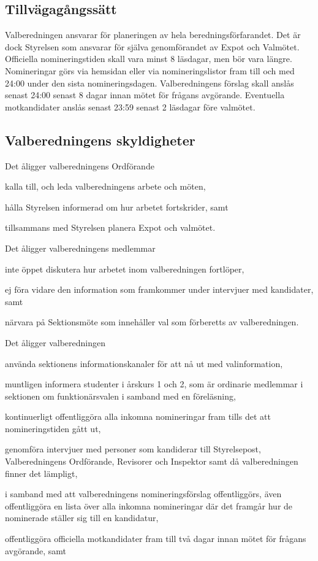 \documentclass[10pt]{article}
\begin{document}
\subsection{Tillvägagångssätt}

Valberedningen ansvarar för planeringen av hela beredningsförfarandet.
Det är dock Styrelsen som ansvarar för själva genomförandet av Expot och
Valmötet. Officiella nomineringstiden skall vara minst 8 läsdagar, men
bör vara längre. Nomineringar görs via hemsidan eller via nomineringslistor fram till och med 24:00 under den sista nomineringsdagen. Valberedningens förslag skall anslås senast 24:00 senast 8 dagar innan mötet för frågans avgörande. Eventuella motkandidater anslås senast 23:59 senast 2 läsdagar före valmötet.

\subsection{Valberedningens skyldigheter}

Det åligger valberedningens Ordförande
\begin{attlist}
    \item kalla till, och leda valberedningens arbete och möten,
    \item hålla Styrelsen informerad om hur arbetet fortskrider, samt
    \item tillsammans med Styrelsen planera Expot och valmötet.
\end{attlist}
Det åligger valberedningens medlemmar
\begin{attlist}
    \item inte öppet diskutera hur arbetet inom valberedningen fortlöper,
    \item ej föra vidare den information som framkommer under intervjuer
        med kandidater, samt
    \item närvara på Sektionsmöte som innehåller val som förberetts av
        valberedningen.
\end{attlist}
Det åligger valberedningen
\begin{attlist}
    \item använda sektionens informationskanaler för att nå ut med valinformation,
    \item muntligen informera studenter i årskurs 1 och 2, som är ordinarie medlemmar i sektionen om funktionärsvalen i samband med
        en föreläsning,
    \item kontinuerligt offentliggöra alla inkomna nomineringar fram tills
        det att nomineringstiden gått ut,
    \item genomföra intervjuer med personer som kandiderar till Styrelsepost,
        Valberedningens Ordförande, Revisorer och
        Inspektor samt då valberedningen finner det lämpligt,
    \item i samband med att valberedningens nomineringsförslag offentliggörs,
        även offentliggöra en lista över alla inkomna nomineringar där det
        framgår hur de nominerade ställer sig till en kandidatur,
    \item offentliggöra officiella motkandidater fram till två dagar innan
        mötet för frågans avgörande, samt
\end{attlist}
\end{document}
